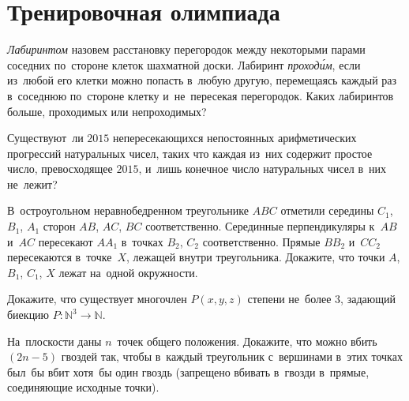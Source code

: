 
\section*{Тренировочная олимпиада}


\begin{problems}

\item
\emph{Лабиринтом} назовем расстановку перегородок между некоторыми парами
соседних по~стороне клеток шахматной доски.
Лабиринт \emph{проход\'{и}м}, если из~любой его клетки можно попасть в~любую
другую, перемещаясь каждый раз в~соседнюю по~стороне клетку и~не~пересекая
перегородок.
Каких лабиринтов больше, проходимых или непроходимых?

\item
Существуют~ли $2015$ непересекающихся непостоянных арифметических прогрессий
натуральных чисел, таких что каждая из~них содержит простое число,
превосходящее $2015$, и~лишь конечное число натуральных чисел в~них не~лежит?

\item
В~остроугольном неравнобедренном треугольнике $ABC$ отметили середины
$C_1$, $B_1$, $A_1$ сторон $AB$, $AC$, $BC$ соответственно.
Серединные перпендикуляры к~$AB$ и~$AC$ пересекают $A A_1$ в~точках
$B_2$, $C_2$ соответственно.
Прямые $B B_2$ и~$C C_2$ пересекаются в~точке~$X$, лежащей внутри треугольника.
Докажите, что точки $A$, $B_1$, $C_1$, $X$ лежат на~одной окружности.

\item
Докажите, что существует многочлен $P(x, y, z)$ степени не~более $3$, задающий
биекцию $P \colon \mathbb{N}^3 \to \mathbb{N}$.

\item
На~плоскости даны $n$~точек общего положения.
Докажите, что можно вбить $(2 n - 5)$ гвоздей так, чтобы в~каждый треугольник
с~вершинами в~этих точках был~бы вбит хотя~бы один гвоздь (запрещено вбивать
в~гвозди в~прямые, соединяющие исходные точки).

\end{problems}

